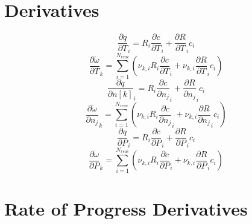 \documentclass[a4paper,10pt]{article}
\newcommand{\nr}{N_{reac}}
\begin{document}
\section{Derivatives}
\begin{dmath} \frac{\partial q }{\partial T }_{i} = R_{i} \frac{\partial c }{\partial T }_{i} + \frac{\partial R }{\partial T }_{i} c_{i}\end{dmath} 
\begin{dmath} \frac{\partial \dot{\omega} }{\partial T }_{k} = \sum_{i=1}^{\nr} \left(\nu_{k,i} R_{i} \frac{\partial c }{\partial T }_{i} + \nu_{k,i} \frac{\partial R }{\partial T }_{i} c_{i}\right)\end{dmath} 
\begin{dmath} \frac{\partial q }{\partial n[k] }_{i} = R_{i} \frac{\partial c }{\partial {n_j} }_{i} + \frac{\partial R }{\partial {n_j} }_{i} c_{i}\end{dmath} 
\begin{dmath} \frac{\partial \dot{\omega} }{\partial {n_j} }_{k} = \sum_{i=1}^{\nr} \left(\nu_{k,i} R_{i} \frac{\partial c }{\partial {n_j} }_{i} + \nu_{k,i} \frac{\partial R }{\partial {n_j} }_{i} c_{i}\right)\end{dmath} 
\begin{dmath} \frac{\partial q }{\partial P }_{i} = R_{i} \frac{\partial c }{\partial P }_{i} + \frac{\partial R }{\partial P }_{i} c_{i}\end{dmath} 
\begin{dmath} \frac{\partial \dot{\omega} }{\partial P }_{k} = \sum_{i=1}^{\nr} \left(\nu_{k,i} R_{i} \frac{\partial c }{\partial P }_{i} + \nu_{k,i} \frac{\partial R }{\partial P }_{i} c_{i}\right)\end{dmath} 
\section{Rate of Progress Derivatives}
\end{document}
